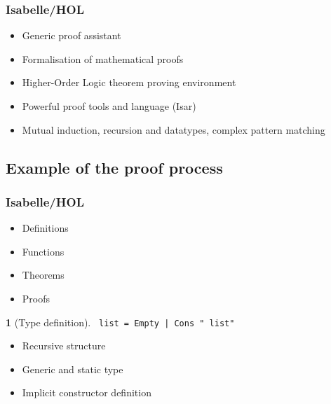 \documentclass{beamer}
\newcommand{\datatype}{{\color{isa_blue}{datatype}}}
\newcommand{\generic}[1]{{\color{isa_purple}{\textquotesingle#1}}}
\newcommand{\isa}[1]{\texttt{#1}}
\theoremstyle{definition}
\newtheorem*{isabelle}{}
\begin{document}
\begin{frame}
  \frametitle{Isabelle/HOL}
  \begin{itemize}
    \item Generic proof assistant
    \vfill
    \item Formalisation of mathematical proofs
    \vfill
    \item Higher-Order Logic theorem proving environment
    \vfill
    \item Powerful proof tools and language (Isar) %
    \vfill
    \item Mutual induction, recursion and datatypes, complex pattern matching
  \end{itemize}
\end{frame}

\subsection[Example proof]{Example of the proof process}

\begin{frame}
  \frametitle{Isabelle/HOL}
  \centering
  \vfill
  \begin{itemize}
    \item<3-> Definitions
    \item<4-> Functions
    \item<5-> Theorems
    \item<6-> Proofs
  \end{itemize}
\end{frame}

\begin{frame}
  \begin{isabelle}[Type definition]
    \isa{
      \datatype{} \generic{a} list = Empty | Cons \generic{a} "\generic{a} list"
    }
  \end{isabelle}
  \begin{itemize}
    \item Recursive structure
    \item Generic and static type
    \item Implicit constructor definition
  \end{itemize}
\end{frame}
\end{document}
